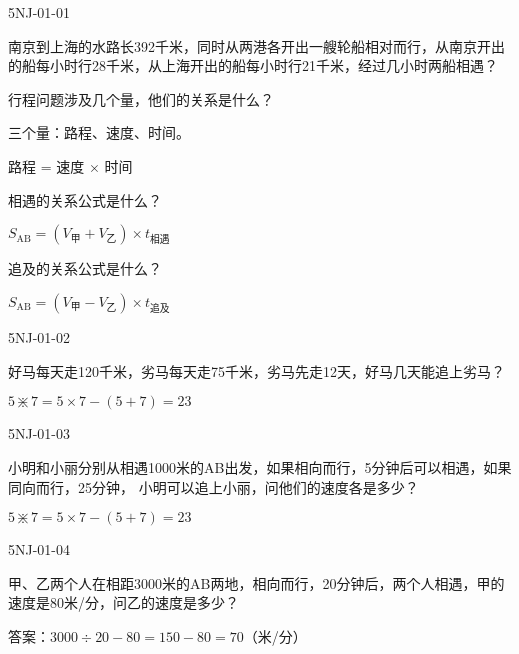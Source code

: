 

\begin{defproblem}{5NJ-01-01}%
\begin{onlyproblem}%
南京到上海的水路长392千米，同时从两港各开出一艘轮船相对而行，从南京开出的船每小时行28千米，从上海开出的船每小时行21千米，经过几小时两船相遇？


\end{onlyproblem}%
\begin{onlysolution}%
行程问题涉及几个量，他们的关系是什么？

三个量：路程、速度、时间。

路程 = 速度 $\times$ 时间

相遇的关系公式是什么？

$S_{\text{AB}}=(V_{\text{甲}}+V_{\text{乙}})\times t_{\text{相遇}}$

追及的关系公式是什么？

$S_{\text{AB}}=(V_{\text{甲}}-V_{\text{乙}})\times t_{\text{追及}}$

\end{onlysolution}%
\end{defproblem}




\begin{defproblem}{5NJ-01-02}%
\begin{onlyproblem}%
好马每天走120千米，劣马每天走75千米，劣马先走12天，好马几天能追上劣马？


\end{onlyproblem}%
\begin{onlysolution}%
$5\divideontimes 7=5\times7-(5+7)=23$
\end{onlysolution}%
\end{defproblem}



\begin{defproblem}{5NJ-01-03}%
\begin{onlyproblem}%
小明和小丽分别从相遇1000米的AB出发，如果相向而行，5分钟后可以相遇，如果同向而行，25分钟， 小明可以追上小丽，问他们的速度各是多少？ 

\end{onlyproblem}%
\begin{onlysolution}%
$5\divideontimes 7=5\times7-(5+7)=23$
\end{onlysolution}%
\end{defproblem}



\begin{defproblem}{5NJ-01-04}%
\begin{onlyproblem}%
甲、乙两个人在相距3000米的AB两地，相向而行，20分钟后，两个人相遇，甲的速度是80米/分，问乙的速度是多少？

\end{onlyproblem}%
\begin{onlysolution}%
答案：$3000\div 20-80=150-80=70$（米/分）
\end{onlysolution}%
\end{defproblem}



